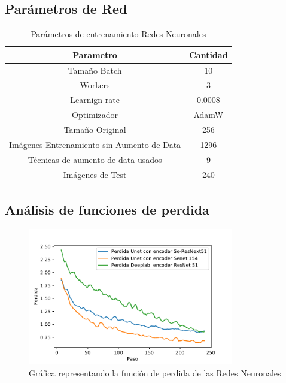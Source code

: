\subsection{Parámetros de Red}
  \begin{table}[H]
      \centering
            \caption{Parámetros de entrenamiento Redes Neuronales}

      \begin{tabular}{|c|c|} \hline
          Parametro & Cantidad  \\\hline
           Tamaño Batch &   10 \\
           Workers & 3 \\
           Learnign rate  & 0.0008\\
           Optimizador & AdamW \\
           Tamaño Original & 256 \\
           Imágenes Entrenamiento sin Aumento de Data & 1296 \\
           
           Técnicas de aumento de data usados  & 9 \\
           Imágenes de Test & 240 \\\hline
           
           
           
           
           
      \end{tabular}
      \label{tab:my_label}
  \end{table}{}


\subsection{Análisis de funciones de perdida}

\begin{figure}[H]
    \centering
    \includegraphics[width=0.8\textwidth]{images/funciones/comparacionesLos.pdf}
    \caption{Gráfica representando la función de perdida de las Redes Neuronales}
    \label{fig:graficasPerdida}
\end{figure}{}

